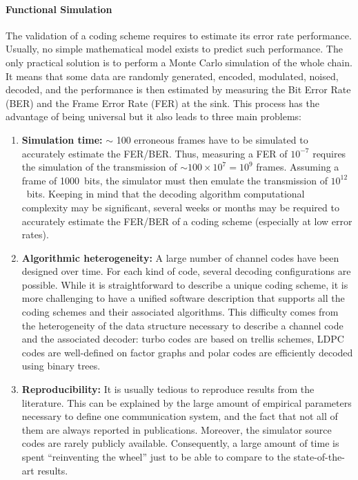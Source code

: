 \paragraph{Functional Simulation}

The validation of a coding scheme requires to estimate its error rate
performance. Usually, no simple mathematical model exists to predict such
performance. The only practical solution is to perform a Monte Carlo simulation
of the whole chain. It means that some data are randomly generated, encoded,
modulated, noised, decoded, and the performance is then estimated by measuring
the Bit Error Rate (BER) and the Frame Error Rate (FER) at the sink. This
process has the advantage of being universal but it also leads to three main
problems:

\begin{enumerate}
  \item \textbf{Simulation time:}
    $\sim$ 100 erroneous frames have to be simulated to accurately estimate the
    FER/BER. Thus, measuring a FER of $10^{-7}$ requires the simulation of the
    transmission of $\sim100\times 10^7=10^9$ frames. Assuming a frame of
    1000~bits, the simulator must then emulate the transmission of
    $10^{12}$~bits. Keeping in mind that the decoding algorithm computational
    complexity may be significant, several weeks or months may be required to
    accurately estimate the FER/BER of a coding scheme (especially at low error
    rates).

  \item \textbf{Algorithmic heterogeneity:} A large number of channel codes have
    been designed over time. For each kind of code, several decoding
    configurations are possible. While it is straightforward to describe a
    unique coding scheme, it is more challenging to have a unified software
    description that supports all the coding schemes and their associated
    algorithms. This difficulty comes from the heterogeneity of the data
    structure necessary to describe a channel code and the associated decoder:
    turbo codes are based on trellis schemes, LDPC codes are well-defined on
    factor graphs and polar codes are efficiently decoded using binary trees.

  \item \textbf{Reproducibility:} It is usually tedious to reproduce results
    from the literature. This can be explained by the large amount of empirical
    parameters necessary to define one communication system, and the fact that
    not all of them are always reported in publications. Moreover, the simulator
    source codes are rarely publicly available. Consequently, a large amount of
    time is spent ``reinventing the wheel'' just to be able to compare to the
    state-of-the-art results.
\end{enumerate}

